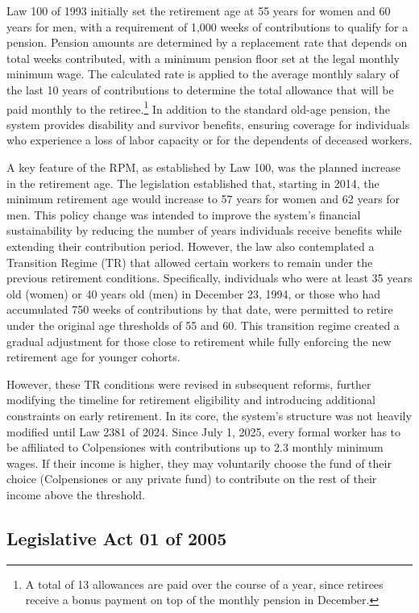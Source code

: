 \documentclass[12pt, a4paper]{article}
\begin{document}
Law 100 of 1993 initially set the retirement age at 55 years for women and 60 years for men, with a requirement of 1,000 weeks of contributions to qualify for a pension. Pension amounts are determined by a replacement rate that depends on total weeks contributed, with a minimum pension floor set at the legal monthly minimum wage. The calculated rate is applied to the average monthly salary of the last 10 years of contributions to determine the total allowance that will be paid monthly to the retiree.\footnote{A total of 13 allowances are paid over the course of a year, since retirees receive a bonus payment on top of the monthly pension in December.} In addition to the standard old-age pension, the system provides disability and survivor benefits, ensuring coverage for individuals who experience a loss of labor capacity or for the dependents of deceased workers.

A key feature of the RPM, as established by Law 100, was the planned increase in the retirement age. The legislation established that, starting in 2014, the minimum retirement age would increase to 57 years for women and 62 years for men. This policy change was intended to improve the system’s financial sustainability by reducing the number of years individuals receive benefits while extending their contribution period. However, the law also contemplated a Transition Regime (TR) that allowed certain workers to remain under the previous retirement conditions. Specifically, individuals who were at least 35 years old (women) or 40 years old (men) in December 23, 1994, or those who had accumulated 750 weeks of contributions by that date, were permitted to retire under the original age thresholds of 55 and 60. This transition regime created a gradual adjustment for those close to retirement while fully enforcing the new retirement age for younger cohorts.

However, these TR conditions were revised in subsequent reforms, further modifying the timeline for retirement eligibility and introducing additional constraints on early retirement. In its core, the system's structure was not heavily modified until Law 2381 of 2024. Since July 1, 2025, every formal worker has to be affiliated to Colpensiones with contributions up to 2.3 monthly minimum wages. If their income is higher, they may voluntarily choose the fund of their choice (Colpensiones or any private fund) to contribute on the rest of their income above the threshold.

\subsection{Legislative Act 01 of 2005}
\end{document}
